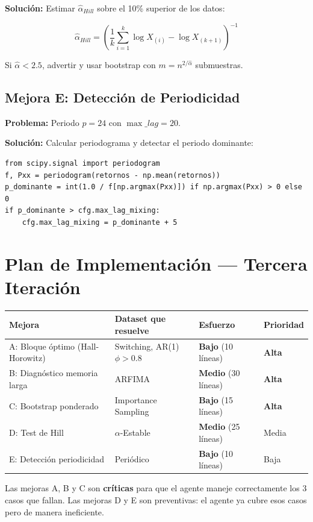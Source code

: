 \documentclass[12pt,a4paper]{article}
\begin{document}
\textbf{Solución:} Estimar $\hat{\alpha}_{Hill}$ sobre el 10\% superior de los datos:

\[
\hat{\alpha}_{Hill} = \left( \frac{1}{k} \sum_{i=1}^{k} \log X_{(i)} - \log X_{(k+1)} \right)^{-1}
\]

Si $\hat{\alpha} < 2.5$, advertir y usar bootstrap con $m = n^{2/\hat{\alpha}}$ submuestras.

\subsection{Mejora E: Detección de Periodicidad}

\textbf{Problema:} Periodo $p=24$ con $\max\_lag=20$.

\textbf{Solución:} Calcular periodograma y detectar el periodo dominante:

\begin{lstlisting}
from scipy.signal import periodogram
f, Pxx = periodogram(retornos - np.mean(retornos))
p_dominante = int(1.0 / f[np.argmax(Pxx)]) if np.argmax(Pxx) > 0 else 0
if p_dominante > cfg.max_lag_mixing:
    cfg.max_lag_mixing = p_dominante + 5
\end{lstlisting}

\newpage

\section{Plan de Implementación — Tercera Iteración}

\begin{longtable}{@{}llll@{}}
\toprule
Mejora & Dataset que resuelve & Esfuerzo & Prioridad \\
\midrule
\endhead
A: Bloque óptimo (Hall-Horowitz) & Switching, AR(1) $\phi>0.8$ & \textbf{Bajo} (10 líneas) & \textbf{Alta} \\
B: Diagnóstico memoria larga & ARFIMA & \textbf{Medio} (30 líneas) & \textbf{Alta} \\
C: Bootstrap ponderado & Importance Sampling & \textbf{Bajo} (15 líneas) & \textbf{Alta} \\
D: Test de Hill & $\alpha$-Estable & \textbf{Medio} (25 líneas) & Media \\
E: Detección periodicidad & Periódico & \textbf{Bajo} (10 líneas) & Baja \\
\bottomrule
\end{longtable}

Las mejoras A, B y C son \textbf{críticas} para que el agente maneje correctamente los 3 casos que fallan. Las mejoras D y E son preventivas: el agente ya cubre esos casos pero de manera ineficiente.
\end{document}
